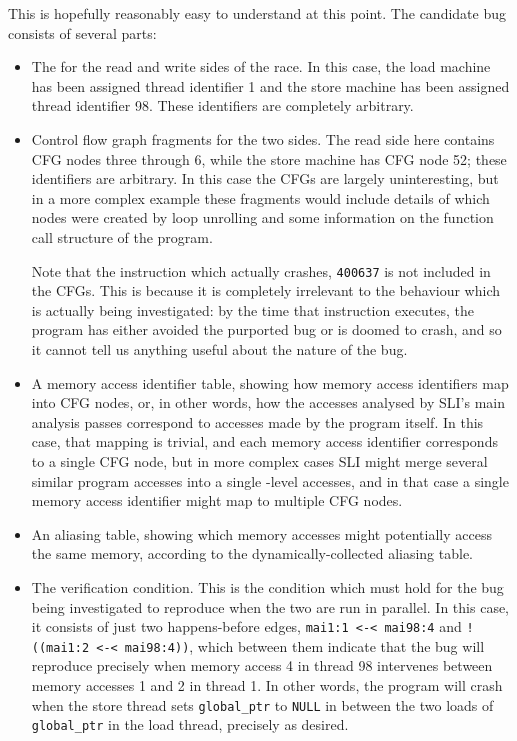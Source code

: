 This is hopefully reasonably easy to understand at this point.  The
candidate bug consists of several parts:

\begin{itemize}
\item The \StateMachines for the read and write sides of the race.  In
  this case, the load machine has been assigned thread identifier 1
  and the store machine has been assigned thread identifier 98.  These
  identifiers are completely arbitrary.
\item Control flow graph fragments for the two sides.  The read side
  here contains CFG nodes three through 6, while the store machine has
  CFG node 52; these identifiers are arbitrary.  In this case the CFGs
  are largely uninteresting, but in a more complex example these
  fragments would include details of which nodes were created by loop
  unrolling and some information on the function call structure of the
  program.

  Note that the instruction which actually crashes, \verb|400637| is
  not included in the CFGs.  This is because it is completely
  irrelevant to the behaviour which is actually being investigated: by
  the time that instruction executes, the program has either avoided
  the purported bug or is doomed to crash, and so it cannot tell us
  anything useful about the nature of the bug.
\item A memory access identifier table, showing how memory access
  identifiers map into CFG nodes, or, in other words, how the accesses
  analysed by SLI's main analysis passes correspond to accesses made
  by the program itself.  In this case, that mapping is trivial, and
  each memory access identifier corresponds to a single CFG node, but
  in more complex cases SLI might merge several similar program
  accesses into a single \StateMachine-level accesses, and in that case
  a single memory access identifier might map to multiple CFG nodes.
\item An aliasing table, showing which memory accesses might
  potentially access the same memory, according to the
  dynamically-collected aliasing table.
\item The verification condition.  This is the condition which must
  hold for the bug being investigated to reproduce when the two
  \StateMachines are run in parallel.  In this case, it consists of
  just two happens-before edges, \verb|mai1:1 <-< mai98:4| and
  \verb|!((mai1:2 <-< mai98:4))|, which between them indicate that the
  bug will reproduce precisely when memory access 4 in thread 98
  intervenes between memory accesses 1 and 2 in thread 1.  In other
  words, the program will crash when the store thread sets
  \verb|global_ptr| to \verb|NULL| in between the two loads of
  \verb|global_ptr| in the load thread, precisely as desired.
\end{itemize}

